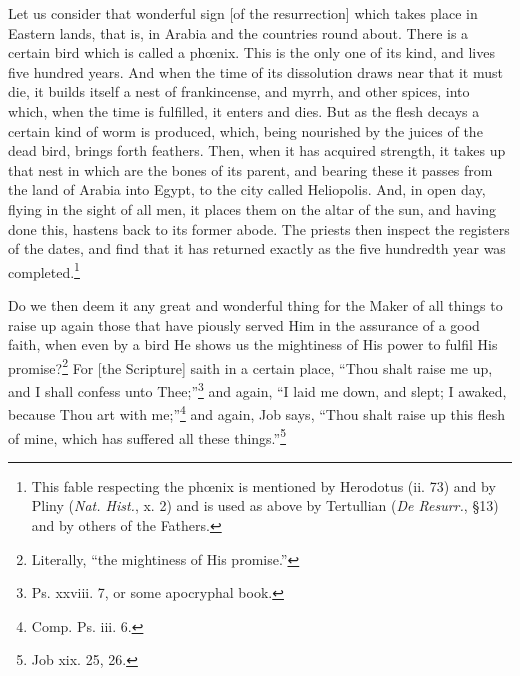Let us consider that wonderful sign [of the resurrection] which takes place in Eastern lands, that is, in Arabia and the countries round about. There is a certain bird which is called a phœnix. This is the only one of its kind, and lives five hundred years. And when the time of its dissolution draws near that it must die, it builds itself a nest of frankincense, and myrrh, and other spices, into which, when the time is fulfilled, it enters and dies. But as the flesh decays a certain kind of worm is produced, which, being nourished by the juices of the dead bird, brings forth feathers. Then, when it has acquired strength, it takes up that nest in which are the bones of its parent, and bearing these it passes from the land of Arabia into Egypt, to the city called Heliopolis. And, in open day, flying in the sight of all men, it places them on the altar of the sun, and having done this, hastens back to its former abode. The priests then inspect the registers of the dates, and find that it has returned exactly as the five hundredth year was completed.\footnote{This fable respecting the phœnix is mentioned by Herodotus (ii. 73) and by Pliny (\emph{Nat. Hist.}, x. 2) and is used as above by Tertullian (\emph{De Resurr.}, §13) and by others of the Fathers.}


Do we then deem it any great and wonderful thing for the Maker of all things to raise up again those that have piously served Him in the assurance of a good faith, when even by a bird He shows us the mightiness of His power to fulfil His promise?\footnote{Literally, “the mightiness of His promise.”} For [the Scripture] saith in a certain place, “Thou shalt raise me up, and I shall confess unto Thee;”\footnote{Ps. xxviii. 7, or some apocryphal book.} and again, “I laid me down, and slept; I awaked, because Thou art with me;”\footnote{Comp. Ps. iii. 6.} and again, Job says, “Thou shalt raise up this flesh of mine, which has suffered all these things.”\footnote{Job xix. 25, 26.}


